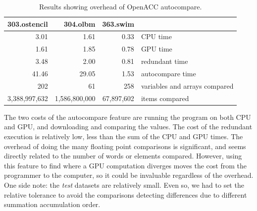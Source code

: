 \begin{table}
\begin{center}
\begin{tabular}{rrrl}
\hline
303.ostencil & 304.olbm & 363.swim & \\
\hline
 3.01 &  1.61 & 0.33 & CPU time \\
 1.61 &  1.85 & 0.78 & GPU time \\
 3.48 &  2.00 & 0.81 & redundant time \\
41.46 & 29.05 & 1.53 & autocompare time \\
202 & 61 & 258 & variables and arrays compared \\
3,388,997,632 & 1,586,800,000 & 67,897,602 & items compared \\
\hline
\end{tabular}
\end{center}
\caption{Results showing overhead of OpenACC autocompare.}
\label{res1}
\end{table}

The two costs of the autocompare feature are running the program on both CPU and GPU, and downloading and comparing the values.
The cost of the redundant execution is relatively low, less than the sum of the CPU and GPU times.
The overhead of doing the many floating point comparisons is significant, and seems directly related to the number of words or elements compared.
However, using this feature to find where a GPU computation diverges moves the cost from the programmer to the computer, so it could be invaluable regardless of the overhead.
One side note: the \emph{test} datasets are relatively small.
Even so, we had to set the relative tolerance to avoid the comparisons detecting differences due to different summation accumulation order.
